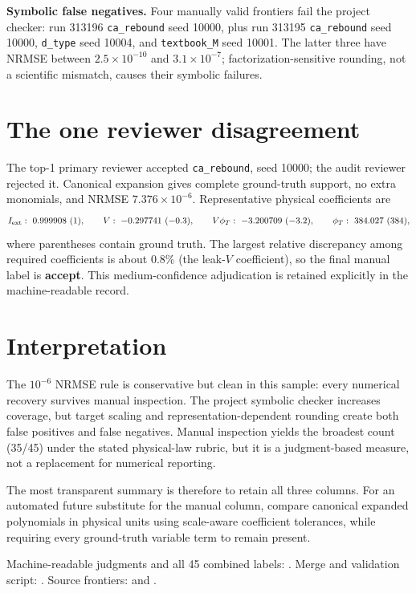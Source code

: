 \documentclass[10pt]{article}
\begin{document}
\textbf{Symbolic false negatives.}  Four manually valid frontiers fail the
project checker: run 313196 \texttt{ca\_rebound} seed 10000, plus run 313195
\texttt{ca\_rebound} seed 10000, \texttt{d\_type} seed 10004, and
\texttt{textbook\_M} seed 10001.  The latter three have NRMSE between
$2.5\times10^{-10}$ and $3.1\times10^{-7}$; factorization-sensitive rounding,
not a scientific mismatch, causes their symbolic failures.

\section*{The one reviewer disagreement}

The top-1 primary reviewer accepted \texttt{ca\_rebound}, seed 10000; the audit
reviewer rejected it.  Canonical expansion gives complete ground-truth support,
no extra monomials, and NRMSE $7.376\times10^{-6}$.  Representative physical
coefficients are
\[
I_{\rm ext}:\ 0.999908\ (1),\qquad
V:\ -0.297741\ (-0.3),\qquad
V\phi_T:\ -3.200709\ (-3.2),\qquad
\phi_T:\ 384.027\ (384),
\]
where parentheses contain ground truth.  The largest relative discrepancy among
required coefficients is about $0.8\%$ (the leak-$V$ coefficient), so the final
manual label is \textbf{accept}.  This medium-confidence adjudication is retained
explicitly in the machine-readable record.

\section*{Interpretation}

The $10^{-6}$ NRMSE rule is conservative but clean in this sample: every numerical
recovery survives manual inspection.  The project symbolic checker increases
coverage, but target scaling and representation-dependent rounding create both
false positives and false negatives.  Manual inspection yields the broadest count
(35/45) under the stated physical-law rubric, but it is a judgment-based measure,
not a replacement for numerical reporting.

The most transparent summary is therefore to retain all three columns.  For an
automated future substitute for the manual column, compare canonical expanded
polynomials in physical units using scale-aware coefficient tolerances, while
requiring every ground-truth variable term to remain present.

\vfill
\footnotesize\raggedright
Machine-readable judgments and all 45 combined labels:
.  Merge and validation script:
.  Source frontiers:
 and
.
\end{document}
